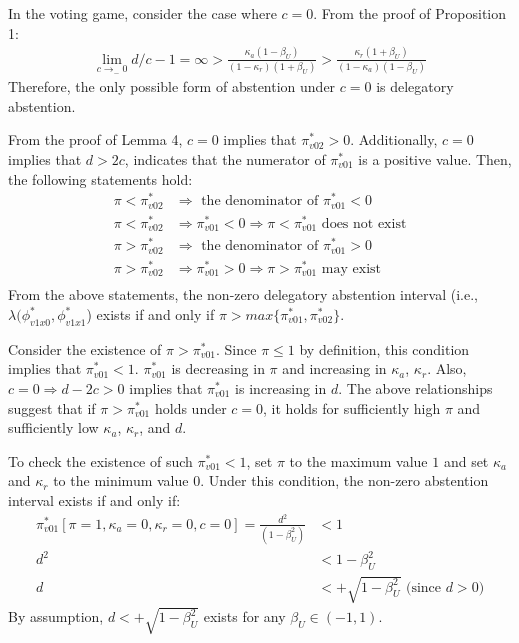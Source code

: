 \par In the voting game, consider the case where $c=0$. From the proof of Proposition 1:
\begin{align*}
\lim_{c \to_{-} 0} d/c - 1 = \infty > \frac{\kappa_a(1-\beta_U)}{(1-\kappa_r)(1+\beta_U)} > \frac{\kappa_r(1+\beta_U)}{(1-\kappa_a)(1-\beta_U)}
\end{align*}
\noindent Therefore, the only possible form of abstention under $c=0$ is delegatory abstention. 

\par From the proof of Lemma 4, $c=0$ implies that $\pi^*_{v02}>0$. Additionally, $c=0$ implies that $d > 2c$, indicates that the numerator of $\pi^*_{v01}$ is a positive value. Then, the following statements hold:
\begin{align*}
\pi<\pi^*_{v02} &\Rightarrow \text{ the denominator of $\pi^*_{v01} < 0$} \\
\pi<\pi^*_{v02} &\Rightarrow \pi^*_{v01} < 0 \Rightarrow \pi < \pi^*_{v01} \text{ does not exist} \\
\pi>\pi^*_{v02} &\Rightarrow \text{ the denominator of $\pi^*_{v01} > 0$} \\
\pi>\pi^*_{v02} &\Rightarrow \pi^*_{v01} > 0 \Rightarrow \pi > \pi^*_{v01} \text{ may exist} \\
\end{align*}
\noindent From the above statements, the non-zero delegatory abstention interval (i.e., $\lambda(\phi^*_{v1x0},\phi^*_{v1x1}$) exists if and only if $\pi > max\{\pi^*_{v01},\pi^*_{v02}\}$.

\par Consider the existence of $\pi > \pi^*_{v01}$. Since $\pi \leq 1$ by definition, this condition implies that $\pi^*_{v01} < 1$. $\pi^*_{v01}$ is decreasing in $\pi$ and increasing in $\kappa_a$, $\kappa_r$. Also, $c=0 \Rightarrow d - 2c > 0$ implies that $\pi^*_{v01}$ is increasing in $d$. The above relationships suggest that if $\pi > \pi^*_{v01}$ holds under $c=0$, it holds for sufficiently high $\pi$ and sufficiently low $\kappa_a$, $\kappa_r$, and $d$.

\par To check the existence of such $\pi^*_{v01} < 1$, set $\pi$ to the maximum value $1$ and set $\kappa_a$ and $\kappa_r$ to the minimum value $0$. Under this condition, the non-zero abstention interval exists if and only if:
\begin{align*}
\pi^*_{v01}[\pi=1,\kappa_a=0,\kappa_r=0,c=0] = \frac{d^2 }{(1 - \beta_U^2)} &< 1\\
d^2 &< 1 - \beta_U^2 \\
d &< +\sqrt{1 - \beta_U^2} \text{ (since $d>0$)} 
\end{align*}
\noindent By assumption, $d < +\sqrt{1 - \beta_U^2}$ exists for any $\beta_U \in (-1,1)$. 

